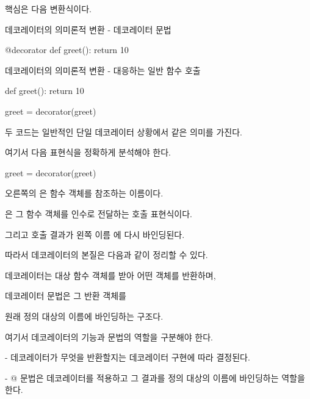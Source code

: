 핵심은 다음 변환식이다.

\begin{dhknote}
\begin{dhksmry}[centered]
데코레이터의 의미론적 변환 - 데코레이터 문법
\end{dhksmry}
\end{dhknote}

\begin{dhkcode}
@decorator
def greet():
    return 10
\end{dhkcode}

\begin{dhknote}
\begin{dhksmry}[centered]
데코레이터의 의미론적 변환 - 대응하는 일반 함수 호출
\end{dhksmry}
\end{dhknote}

\begin{dhkcode}
def greet():
    return 10

greet = decorator(greet)
\end{dhkcode}

두 코드는 일반적인 단일 데코레이터 상황에서 같은 의미를 가진다.

여기서 다음 표현식을 정확하게 분석해야 한다.

\begin{dhkcode}
greet = decorator(greet)
\end{dhkcode}

오른쪽의 은 함수 객체를 참조하는 이름이다.

은 그 함수 객체를 인수로 전달하는 호출 표현식이다.

그리고 호출 결과가 왼쪽 이름 에 다시 바인딩된다.

따라서 데코레이터의 본질은 다음과 같이 정리할 수 있다.

\begin{dhksmry}[centered]
데코레이터는 대상 함수 객체를 받아 어떤 객체를 반환하며,

데코레이터 문법은 그 반환 객체를 

원래 정의 대상의 이름에 바인딩하는 구조다.
\end{dhksmry}

여기서 데코레이터의 기능과  문법의 역할을 구분해야 한다.

\begin{dhksmry}
    - 데코레이터가 무엇을 반환할지는 데코레이터 구현에 따라 결정된다.

    - @ 문법은 데코레이터를 적용하고 그 결과를 정의 대상의 이름에
      바인딩하는 역할을 한다.
\end{dhksmry}

